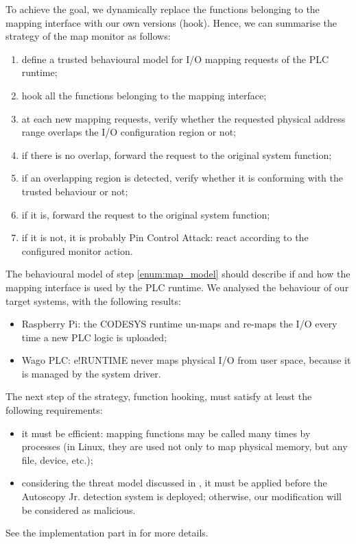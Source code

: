 To achieve the goal, we dynamically replace the functions belonging to the mapping interface with our own versions (hook).
Hence, we can summarise the strategy of the map monitor as follows:
\begin{enumerate}
	\item \label{enum:map_model} define a trusted behavioural model for I/O mapping requests of the PLC runtime;
	\item hook all the functions belonging to the mapping interface;
	\item at each new mapping requests, verify whether the requested physical address range overlaps the I/O configuration region or not;
	\item if there is no overlap, forward the request to the original system function;
	\item if an overlapping region is detected, verify whether it is conforming with the trusted behaviour or not;
	\item if it is, forward the request to the original system function;
	\item if it is not, it is probably Pin Control Attack: react according to the configured monitor action.
\end{enumerate}
The behavioural model of step \ref{enum:map_model} should describe if and how the mapping interface is used by the PLC runtime.
We analysed the behaviour of our target systems, with the following results:
\begin{itemize}
	\item Raspberry Pi: the CODESYS runtime un-maps and re-maps the I/O every time a new PLC logic is uploaded;
	\item Wago PLC: e!RUNTIME never maps physical I/O from user space, because it is managed by the system driver.
\end{itemize}
The next step of the strategy, function hooking, must satisfy at least the following requirements:
\begin{itemize}
	\item it must be efficient: mapping functions may be called many times by processes (\eg in Linux, they are used not only to map physical memory,
		but any file, device, etc.);
	\item considering the threat model discussed in , it must be applied before the Autoscopy Jr. detection system is deployed;
		otherwise, our modification will be considered as malicious.
\end{itemize}
See the implementation part in  for more details.

